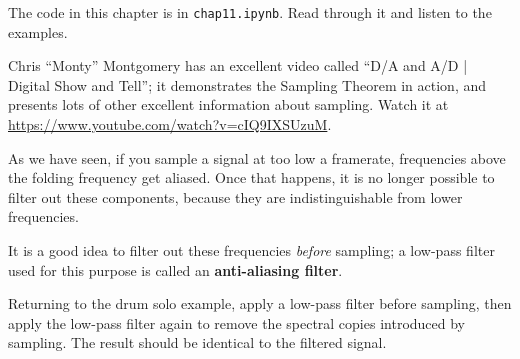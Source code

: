 \documentclass[12pt]{book} \usepackage[width=5.5in,height=8.5in, hmarginratio=3:2,vmarginratio=1:1]{geometry}
\begin{document}
\begin{exercise} The code in this chapter is in {\tt chap11.ipynb}. Read through it and listen to the examples. \end{exercise} 

\begin{exercise} Chris ``Monty'' Montgomery has an excellent video called ``D/A and A/D | Digital Show and Tell''; it demonstrates the Sampling Theorem in action, and presents lots of other excellent information about sampling. Watch it at \url{https://www.youtube.com/watch?v=cIQ9IXSUzuM}. \end{exercise} 

\begin{exercise} As we have seen, if you sample a signal at too low a framerate, frequencies above the folding frequency get aliased. Once that happens, it is no longer possible to filter out these components, because they are indistinguishable from lower frequencies. 

It is a good idea to filter out these frequencies {\em before} sampling; a low-pass filter used for this purpose is called an {\bf anti-aliasing filter}. 

Returning to the drum solo example, apply a low-pass filter before sampling, then apply the low-pass filter again to remove the spectral copies introduced by sampling. The result should be identical to the filtered signal. \end{exercise} 

\backmatter

\printindex
\end{document}
